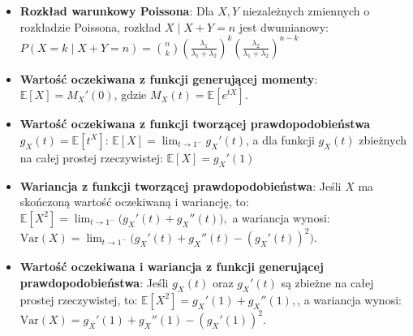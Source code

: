 \documentclass{article}
\theoremstyle{definition}
\theoremstyle{remark}
\begin{document}
\begin{multicols}{2}
\begin{itemize}
    \item \textbf{Rozkład warunkowy Poissona}: Dla \( X, Y \) niezależnych zmiennych o rozkładzie Poissona, rozkład \( X \mid X + Y = n \) jest dwumianowy:
    \(
    P(X = k \mid X + Y = n) = \binom{n}{k} \left( \frac{\lambda_1}{\lambda_1 + \lambda_2} \right)^k \left( \frac{\lambda_2}{\lambda_1 + \lambda_2} \right)^{n-k}
    \)
    
    \item \textbf{Wartość oczekiwana z funkcji generującej momenty}: \(\mathbb{E}[X] = M_X'(0)\), gdzie \( M_X(t) = \mathbb{E}[e^{tX}] \).
    
    \item \textbf{Wartość oczekiwana z funkcji tworzącej prawdopodobieństwa} \( g_X(t) = \mathbb{E}[t^X] \): \(\mathbb{E}[X] = \lim_{t \to 1^-} g_X'(t)\), 
    a dla funkcji \( g_X(t) \) zbieżnych na całej prostej rzeczywistej: \(\mathbb{E}[X] = g_X'(1)\)
    
    \item \textbf{Wariancja z funkcji tworzącej prawdopodobieństwa}: 
    Jeśli \( X \) ma skończoną wartość oczekiwaną i wariancję, to:
    \(
    \mathbb{E}[X^2] = \lim_{t \to 1^-} \big(g_X'(t) + g_X''(t)\big),
    \)
    a wariancja wynosi:
    \(
    \mathrm{Var}(X) = \lim_{t \to 1^-} \big(g_X'(t) + g_X''(t) - (g_X'(t))^2\big).
    \)
    
    \item \textbf{Wartość oczekiwana i wariancja z funkcji generującej prawdopodobieństwa}: 
    Jeśli \( g_X(t) \) oraz \( g_X'(t) \) są zbieżne na całej prostej rzeczywistej, to:
    \(
    \mathbb{E}[X^2] = g_X'(1) + g_X''(1),
    \), a wariancja wynosi:
    \(
    \text{Var}(X) = g_X'(1) + g_X''(1) - (g_X'(1))^2.
    \)
    
    \end{itemize}




\end{multicols}
\end{document}
